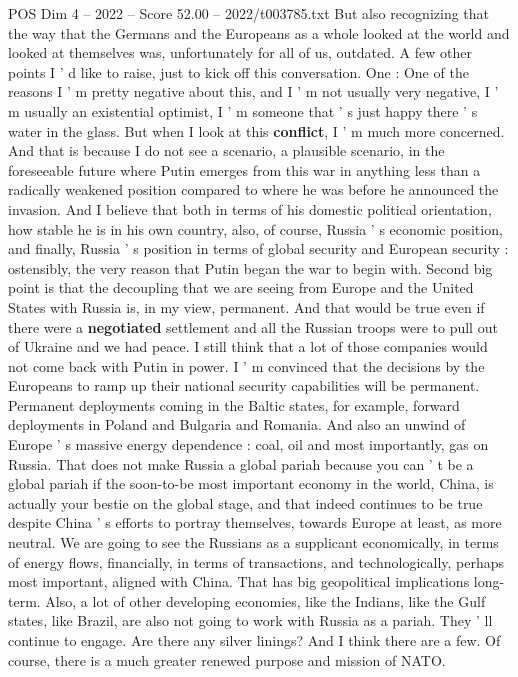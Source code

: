 \begin{textsample}{POS Dim 4 – 2022 – Score 52.00 – 2022/t003785.txt}
But also recognizing that the way that the Germans and the Europeans as a whole looked at the world and looked at themselves was, unfortunately for all of us, outdated.
A few other points I ' d like to raise, just to kick off this conversation.
One : One of the reasons I ' m pretty negative about this, and I ' m not usually very negative, I ' m usually an existential optimist, I ' m someone that ' s just happy there ' s water in the glass.
But when I look at this \textbf{conflict}, I ' m much more concerned.
And that is because I do not see a scenario, a plausible scenario, in the foreseeable future where Putin emerges from this war in anything less than a radically weakened position compared to where he was before he announced the invasion.
And I believe that both in terms of his domestic political orientation, how stable he is in his own country, also, of course, Russia ' s economic position, and finally, Russia ' s position in terms of global security and European security : ostensibly, the very reason that Putin began the war to begin with.
Second big point is that the decoupling that we are seeing from Europe and the United States with Russia is, in my view, permanent.
And that would be true even if there were a \textbf{negotiated} settlement and all the Russian troops were to pull out of Ukraine and we had peace.
I still think that a lot of those companies would not come back with Putin in power.
I ' m convinced that the decisions by the Europeans to ramp up their national security capabilities will be permanent.
Permanent deployments coming in the Baltic states, for example, forward deployments in Poland and Bulgaria and Romania.
And also an unwind of Europe ' s massive energy dependence : coal, oil and most importantly, gas on Russia.
That does not make Russia a global pariah because you can ' t be a global pariah if the soon-to-be most important economy in the world, China, is actually your bestie on the global stage, and that indeed continues to be true despite China ' s efforts to portray themselves, towards Europe at least, as more neutral.
We are going to see the Russians as a supplicant economically, in terms of energy flows, financially, in terms of transactions, and technologically, perhaps most important, aligned with China.
That has big geopolitical implications long-term.
Also, a lot of other developing economies, like the Indians, like the Gulf states, like Brazil, are also not going to work with Russia as a pariah.
They ' ll continue to engage.
Are there any silver linings?
And I think there are a few.
Of course, there is a much greater renewed purpose and mission of NATO.

\end{textsample}
